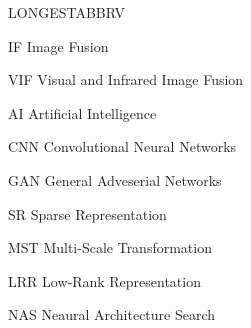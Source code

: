 \begin{theglossary}{LONGESTABBRV}

\item[IF] Image Fusion
\item[VIF] Visual and Infrared Image Fusion 
\item[AI] Artificial Intelligence
\item[CNN] Convolutional Neural Networks
\item[GAN] General Adveserial Networks   
\item[SR] Sparse Representation
\item[MST] Multi-Scale Transformation
\item[LRR] Low-Rank Representation
\item[NAS] Neaural Architecture Search 
\end{theglossary}
